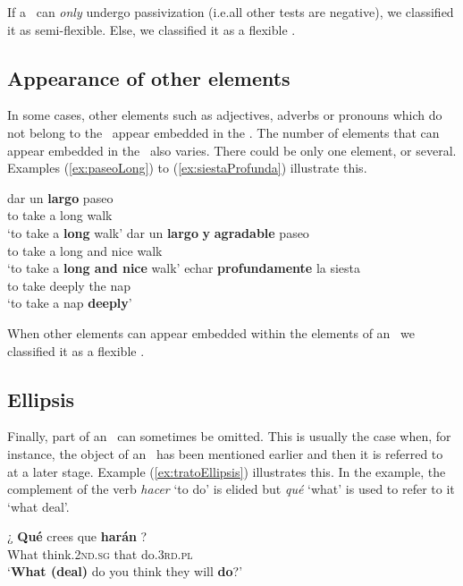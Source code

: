 \documentclass[output=paper]{langsci/langscibook}
\begin{document}
If a \mwe\ can \textit{only} undergo passivization (i.e.\@ all other tests are negative), we classified it as semi-flexible.
Else, we classified it as a flexible \mwe.

\subsection{Appearance of other elements}
\label{ssec:appearanceExtElems}
In some cases, other elements such as adjectives, adverbs or pronouns which do not belong to the \mwe\ appear embedded in the \mwe.
The number of elements that can appear embedded in the \mwe\ also varies.
There could be only one element, or several.
Examples (\ref{ex:paseoLong}) to (\ref{ex:siestaProfunda}) illustrate this.

\begin{exe}
\ex \label{ex:paseoLong}
\gll dar un \textbf{largo} paseo \\
{to take} a long walk\\
\glt `to take a \textbf{long} walk'
\ex \label{ex:paseoLongNice}
\gll dar un \textbf{largo} \textbf{y} \textbf{agradable} paseo \\
{to take} a long and nice walk \\
\glt `to take a \textbf{long and nice} walk'
\ex \label{ex:siestaProfunda}
\gll echar \textbf{profundamente} la siesta \\
{to take} deeply the nap \\
\glt `to take a nap \textbf{deeply}'
\end{exe}

When other elements can appear embedded within the elements of an \mwe\ we classified it as a flexible \mwe.

\subsection{Ellipsis}
\label{ssec:ellipsis}
Finally, part of an \mwe\ can sometimes be omitted. 
This is usually the case when, for instance, the object of an \mwe\ has been mentioned earlier and then it is referred to at a later stage.
Example (\ref{ex:tratoEllipsis}) illustrates this. 
In the example, the complement of the verb \textit{hacer} `to do' is elided but \textit{qué} `what' is used to refer to it `what deal'.

\begin{exe}
\ex \label{ex:tratoEllipsis}
\gll ¿ \textbf{Qué} crees que \textbf{harán} ? \\
{} What think.\textsc{2nd.sg} that do.\textsc{3rd.pl} \\
\glt `\textbf{What (deal)} do you think they will \textbf{do}?'
\end{exe}
\end{document}
